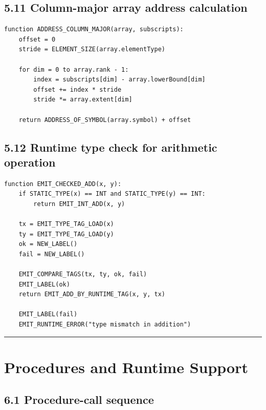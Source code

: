 \documentclass[10pt,letterpaper]{article}
\begin{document}
\subsection*{5.11 Column-major array address calculation}
{}

\begin{verbatim}
function ADDRESS_COLUMN_MAJOR(array, subscripts):
    offset = 0
    stride = ELEMENT_SIZE(array.elementType)

    for dim = 0 to array.rank - 1:
        index = subscripts[dim] - array.lowerBound[dim]
        offset += index * stride
        stride *= array.extent[dim]

    return ADDRESS_OF_SYMBOL(array.symbol) + offset
\end{verbatim}

\subsection*{5.12 Runtime type check for arithmetic operation}
{}

\begin{verbatim}
function EMIT_CHECKED_ADD(x, y):
    if STATIC_TYPE(x) == INT and STATIC_TYPE(y) == INT:
        return EMIT_INT_ADD(x, y)

    tx = EMIT_TYPE_TAG_LOAD(x)
    ty = EMIT_TYPE_TAG_LOAD(y)
    ok = NEW_LABEL()
    fail = NEW_LABEL()

    EMIT_COMPARE_TAGS(tx, ty, ok, fail)
    EMIT_LABEL(ok)
    return EMIT_ADD_BY_RUNTIME_TAG(x, y, tx)

    EMIT_LABEL(fail)
    EMIT_RUNTIME_ERROR("type mismatch in addition")
\end{verbatim}

\medskip\hrule\medskip

\clearpage
\section{Procedures and Runtime Support}

\subsection*{6.1 Procedure-call sequence}
{}
\end{document}
